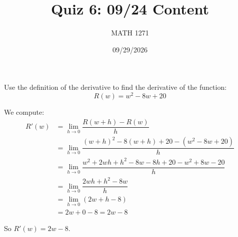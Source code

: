 \documentclass[addpoints,12pt]{exam}
\title{\vspace{-0.5in}Quiz 6: 09/24 Content}
\date{09/29/2026}
\author{MATH 1271}
\begin{document}
  \NameSection
  {\let\newpage\relax\maketitle}

  \PointsSection

  \newpage
  \begin{questions}
    \question[5] Use the definition of the derivative
    to find the derivative of the function:
    \begin{equation*}
      R(w) = w^2 - 8w + 20 
    \end{equation*}
    \begin{solution}
      We compute:
      \begin{align}
        R'(w) &= \lim\limits_{h \rightarrow 0} \dfrac{R(w + h) - R(w)}{h} \\
              &= \lim\limits_{h \rightarrow 0} \dfrac{(w + h)^2 - 8(w + h) + 20 - (w^2 - 8w + 20)}{h} \\
              &= \lim\limits_{h \rightarrow 0} \dfrac{w^2 + 2wh + h^2 - 8w - 8h + 20 -w^2 + 8w - 20}{h} \\
              &= \lim\limits_{h \rightarrow 0} \dfrac{2wh + h^2 - 8w}{h} \\
              &= \lim\limits_{h \rightarrow 0} (2w + h - 8) \\
              &= 2w + 0 - 8 = 2w - 8
      \end{align}

      So $R'(w) = 2w - 8$.
    \end{solution}
  \end{questions}
\end{document}
